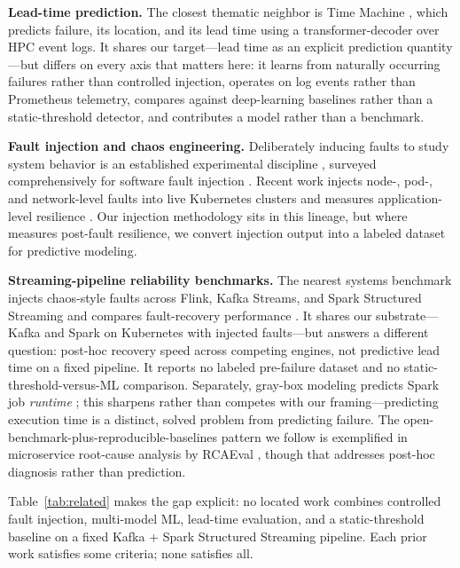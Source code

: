 \documentclass[conference]{IEEEtran}
\begin{document}
\textbf{Lead-time prediction.} The closest thematic neighbor is Time Machine \cite{alharthi2023}, which predicts failure, its location, and its lead time using a transformer-decoder over HPC event logs. It shares our target---lead time as an explicit prediction quantity---but differs on every axis that matters here: it learns from naturally occurring failures rather than controlled injection, operates on log events rather than Prometheus telemetry, compares against deep-learning baselines rather than a static-threshold detector, and contributes a model rather than a benchmark.

\textbf{Fault injection and chaos engineering.} Deliberately inducing faults to study system behavior is an established experimental discipline \cite{basiri2016}, surveyed comprehensively for software fault injection \cite{natella2016}. Recent work injects node-, pod-, and network-level faults into live Kubernetes clusters and measures application-level resilience \cite{chen2025}. Our injection methodology sits in this lineage, but where \cite{chen2025} measures post-fault resilience, we convert injection output into a labeled dataset for predictive modeling.

\textbf{Streaming-pipeline reliability benchmarks.} The nearest systems benchmark injects chaos-style faults across Flink, Kafka Streams, and Spark Structured Streaming and compares fault-recovery performance \cite{vogel2024}. It shares our substrate---Kafka and Spark on Kubernetes with injected faults---but answers a different question: post-hoc recovery speed across competing engines, not predictive lead time on a fixed pipeline. It reports no labeled pre-failure dataset and no static-threshold-versus-ML comparison. Separately, gray-box modeling predicts Spark job \emph{runtime} \cite{alsayeh2020}; this sharpens rather than competes with our framing---predicting execution time is a distinct, solved problem from predicting failure. The open-benchmark-plus-reproducible-baselines pattern we follow is exemplified in microservice root-cause analysis by RCAEval \cite{pham2025}, though that addresses post-hoc diagnosis rather than prediction.

Table~\ref{tab:related} makes the gap explicit: no located work combines controlled fault injection, multi-model ML, lead-time evaluation, and a static-threshold baseline on a fixed Kafka + Spark Structured Streaming pipeline. Each prior work satisfies some criteria; none satisfies all.
\end{document}
